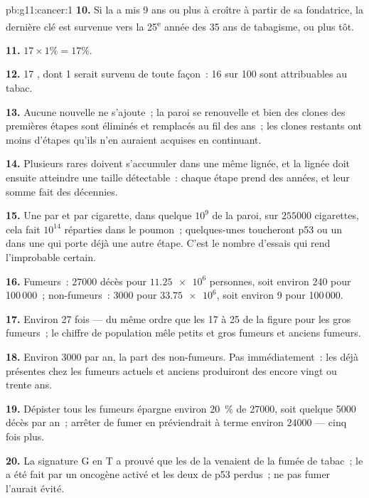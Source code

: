 \begin{solution}{pb:g11:cancer:1}
\textbf{10.} Si la  a mis 9 ans ou plus à croître à partir de sa
 fondatrice, la dernière  clé est survenue vers la
25\textsuperscript{e} année des 35 ans de tabagisme, ou plus tôt.

\textbf{11.} $17 \times 1\% = 17\%$.

\textbf{12.} 17 , dont 1 serait survenu de toute façon~: 16 sur
100 sont attribuables au tabac.

\textbf{13.} Aucune  nouvelle ne s'ajoute~; la paroi se
renouvelle et bien des clones  des premières étapes sont
éliminés et remplacés au fil des ans~; les clones restants ont moins
d'étapes qu'ils n'en auraient acquises en continuant.

\textbf{14.} Plusieurs  rares doivent s'accumuler dans une
même lignée, et la lignée doit ensuite atteindre une taille
détectable~: chaque étape prend des années, et leur somme fait des
décennies.

\textbf{15.} Une  par  et par cigarette, dans quelque
$10^9$  de la paroi, sur $\num{255000}$ cigarettes, cela fait
$10^{14}$  réparties dans le poumon~; quelques-unes toucheront
p53 ou un  dans une  qui porte déjà une autre
étape. C'est le nombre d'essais qui rend l'improbable certain.

\textbf{16.} Fumeurs~: $\num{27000}$ décès pour $\num{11.25e6}$
personnes, soit environ 240 pour 100\,000~; non-fumeurs~: 3000 pour
$\num{33.75e6}$, soit environ 9 pour 100\,000.

\textbf{17.} Environ 27 fois --- du même ordre que les 17 à 25 de la
figure pour les gros fumeurs~; le chiffre de population mêle petits et
gros fumeurs et anciens fumeurs.

\textbf{18.} Environ 3000 par an, la part des non-fumeurs. Pas
immédiatement~: les  déjà présentes chez les fumeurs actuels
et anciens produiront des  encore vingt ou trente ans.

\textbf{19.} Dépister tous les fumeurs épargne environ 20~\% de
$\num{27000}$, soit quelque 5000 décès par an~; arrêter de fumer en
préviendrait à terme environ $\num{24000}$ --- cinq fois plus.

\textbf{20.} La signature G en T a prouvé que les  de la
 venaient de la fumée de tabac~; le  a été fait par un
oncogène activé et les deux  de p53 perdus~; ne pas fumer
l'aurait évité.
\end{solution}
